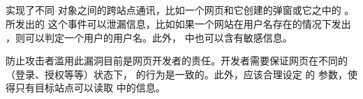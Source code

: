 \subsection{}

 实现了不同  对象之间的跨站点通讯，比如一个网页和它创建的弹窗或它之中的  \cite{pm}。 所发出的  这个事件可以泄漏信息，比如如果一个网站在用户名存在的情况下发出 ，则可以判定一个用户的用户名。此外， 中也可以含有敏感信息。

防止攻击者滥用此漏洞目前是网页开发者的责任。开发者需要保证网页在不同的（登录、授权等等）状态下， 的行为是一致的。此外，应该合理设定  的   参数，使得只有目标站点可以读取  中的信息。
